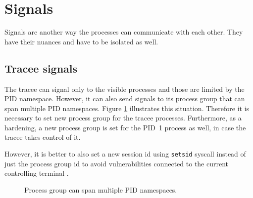 \documentclass[en]{pracamgr}
\begin{document}
\section{Signals}

Signals are another way the processes can communicate with each other. They have their nuances and have to be isolated as well.

\subsection{Tracee signals}

The tracee can signal only to the visible processes and those are limited by the PID namespace. However, it can also send signals to its process group that can span multiple PID namespaces. Figure \ref{fig:pgid_and_pid_namespace} illustrates this situation. Therefore it is necessary to set new process group for the tracee processes. Furthermore, as a hardening, a new process group is set for the PID~1 process as well, in case the tracee takes control of it.

However, it is better to also set a new session id using \texttt{setsid} syscall instead of just the process group id to avoid vulnerabilities connected to the current controlling terminal \cite{bubblewrap_cve}.

\begin{figure}[h]
\tikzset{>=latex} %
\centering
{}
\caption{Process group can span multiple PID namespaces.}
\label{fig:pgid_and_pid_namespace}
\end{figure}
\end{document}
